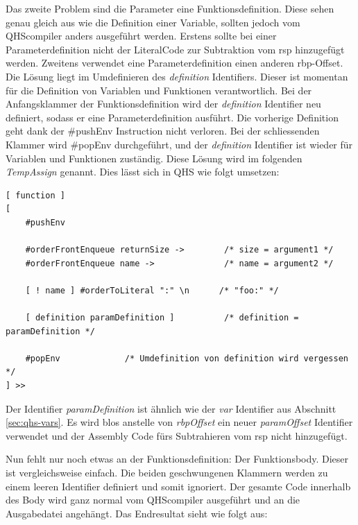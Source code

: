 Das zweite Problem sind die Parameter eine Funktionsdefinition. Diese sehen genau gleich aus wie die Definition einer Variable, sollten jedoch vom QHScompiler anders ausgeführt werden.
Erstens sollte bei einer Parameterdefinition nicht der LiteralCode zur Subtraktion vom rsp hinzugefügt werden. Zweitens verwendet eine Parameterdefinition einen anderen rbp-Offset.
Die Lösung liegt im Umdefinieren des \textit{definition} Identifiers. Dieser ist momentan für die Definition von Variablen und Funktionen verantwortlich.
Bei der Anfangsklammer der Funktionsdefinition wird der \textit{definition} Identifier neu definiert, sodass er eine Parameterdefinition ausführt. Die vorherige Definition geht dank der \#pushEnv Instruction nicht verloren.
Bei der schliessenden Klammer wird \#popEnv durchgeführt, und der \textit{definition} Identifier ist wieder für Variablen und Funktionen zuständig. Diese Lösung wird im folgenden \textit{TempAssign} genannt.
Dies lässt sich in QHS wie folgt umsetzen:

\begin{minipage}{\linewidth}
\begin{lstlisting}[language=QHS, caption=Implementation eines TempAssigns für Parameter Definitionen]
[ function ]
[
    #pushEnv

    #orderFrontEnqueue returnSize ->        /* size = argument1 */
    #orderFrontEnqueue name ->              /* name = argument2 */

    [ ! name ] #orderToLiteral ":" \n      /* "foo:" */

    [ definition paramDefinition ]          /* definition = paramDefinition */

    #popEnv             /* Umdefinition von definition wird vergessen */
] >>
\end{lstlisting}
\end{minipage}

Der Identifier \textit{paramDefinition} ist ähnlich wie der \textit{var} Identifier aus Abschnitt \ref{sec:qhs-vars}.
Es wird blos anstelle von \textit{rbpOffset} ein neuer \textit{paramOffset} Identifier verwendet und der Assembly Code fürs Subtrahieren vom rsp nicht hinzugefügt.

Nun fehlt nur noch etwas an der Funktionsdefinition: Der Funktionsbody. Dieser ist vergleichsweise einfach. Die beiden geschwungenen Klammern werden zu einem leeren Identifier definiert und somit ignoriert.
Der gesamte Code innerhalb des Body wird ganz normal vom QHScompiler ausgeführt und an die Ausgabedatei angehängt. Das Endresultat sieht wie folgt aus:

